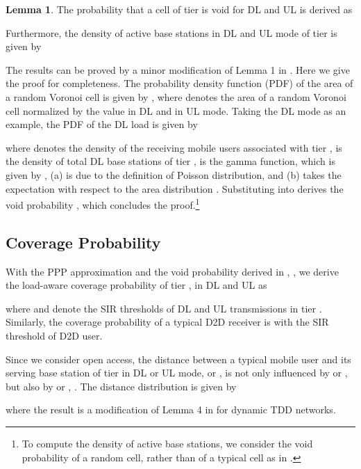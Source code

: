 \documentclass[twocolumn,english]{IEEEtran}
\theoremstyle{plain}
\theoremstyle{definition}
\newtheorem{lemma}{\textbf{Lemma}}
\begin{document}
\begin{lemma}

The probability that a cell of tier  is void for DL and UL is
derived as


Furthermore, the density of active base stations in DL and UL mode
of tier  is given by


\begin{IEEEproof}
The results can be proved by a minor modification of Lemma 1 in \cite{DCAB}.
Here we give the proof for completeness. The probability density function
(PDF) of the area of a random Voronoi cell is given by ,
where  denotes the area of a random Voronoi cell normalized by
the value  in DL and 
in UL mode. Taking the DL mode as an example, the PDF of the DL load
\textbf{ }is given by

where 
denotes the density of the receiving mobile users associated with
tier ,  is the density of total
DL base stations of tier ,  is the gamma function,
which is given by ,
(a) is due to the definition of Poisson distribution, and (b) takes
the expectation with respect to the area distribution .
Substituting  into  derives the void
probability ,
which concludes the proof.\footnote{To compute the density of active base stations, we consider the void
probability of a random cell, rather than of a typical cell as in
\cite{OIHN}. }
\end{IEEEproof}
\end{lemma}


\subsection{Coverage Probability}

With the PPP approximation and the void probability derived in ,
, we derive the load-aware coverage probability
of tier ,  in DL and UL as

where  and  denote
the SIR thresholds of DL and UL transmissions in tier . Similarly,
the coverage probability of a typical D2D receiver is 
with  the SIR threshold of D2D user.

Since we consider open access, the distance between a typical mobile
user and its serving base station of tier  in DL or UL mode, 
or , is not only influenced by 
or , but also by 
or , . The distance distribution
is given by


where the result is a modification of Lemma 4 in \cite{HCNW} for
dynamic TDD networks.
\end{document}
